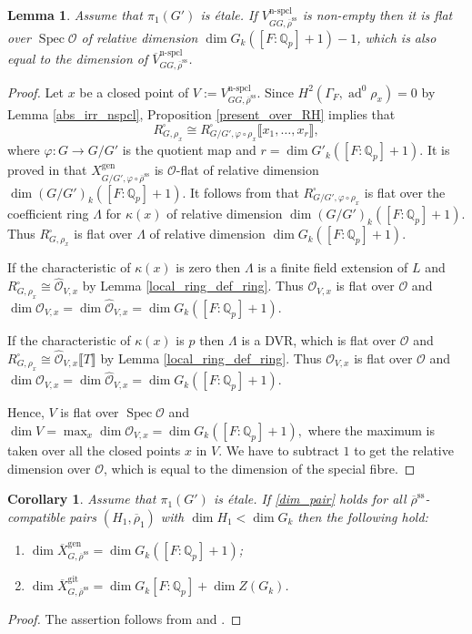 \documentclass{amsart}
\newtheorem{lem}[prop]{Lemma}
\newtheorem{cor}[prop]{Corollary}
\theoremstyle{definition}
\theoremstyle{remark}
\DeclareMathOperator{\Spec}{Spec}
\newcommand{\Qp}{\mathbb {Q}_p}
\newcommand{\Vbar}{\overline{{V}}}
\newcommand{\OO}{\mathcal O}
\DeclareMathOperator{\ad}{ad}
\newcommand{\br}[1]{\llbracket #1\rrbracket}
\newcommand{\rhobar}{\overline{\rho}}
\newcommand{\gen}{\mathrm{gen}}
\newcommand{\gps}{\mathrm{git}}
\newcommand{\Xbar}{\overline{X}}
\DeclareMathOperator{\nspcl}{n-spcl}
\newcommand{\rhobarss}{\rhobar^{\mathrm{ss}}}
\begin{document}
\begin{lem}\label{dim_Vnspcl} Assume that $\pi_1(G')$ is \'etale. If $V^{\nspcl}_{GG, \rhobarss}$ is non-empty then it is flat over $\Spec \OO$ of relative dimension $\dim G_k([F:\Qp]+1) -1$, which is also equal to the dimension of $\Vbar^{\nspcl}_{GG, \rhobarss}$.
\end{lem}
\begin{proof} Let $x$ be a closed point of $V:=V^{\nspcl}_{GG, \rhobarss}$. Since 
$H^2(\Gamma_F, \ad^0\rho_x)=0$ by Lemma \ref{abs_irr_nspcl}, Proposition \ref{present_over_RH} implies that 
\begin{equation}
R^{\square}_{G, \rho_x}\cong R^{\square}_{G/G', \varphi\circ \rho_x}\br{x_1,\ldots, x_r},
\end{equation}
where $\varphi: G \rightarrow G/G'$ is the quotient map and $r= \dim G'_k ([F:\Qp]+1)$. It is proved 
in \cite[Corollary 9.5]{defT}   that $X^{\gen}_{G/G', \varphi\circ \rhobarss}$ is 
$\OO$-flat of relative dimension $\dim (G/G')_k([F:\Qp] + 1)$. It follows from 
 that 
$R^{\square}_{G/G', \varphi\circ \rho_x}$ is flat over the coefficient ring $\Lambda$ for $\kappa(x)$ 
of relative dimension $\dim (G/G')_k([F:\Qp] + 1)$. Thus $R^{\square}_{G, \rho_x}$ is flat over $\Lambda$ of relative dimension $\dim G_k ([F:\Qp]+1)$. 

If the characteristic of $\kappa(x)$ is zero then $\Lambda$ is a finite field extension of $L$
and $R^{\square}_{G, \rho_x}\cong \hat{\OO}_{V,x}$ by Lemma \ref{local_ring_def_ring}. 
Thus $\OO_{V,x}$ is flat over $\OO$ and $\dim \OO_{V,x}= \dim \hat{\OO}_{V,x}= \dim G_k ([F:\Qp]+1)$. 

If the characteristic of $\kappa(x)$ is $p$ then $\Lambda$ is a DVR, which is flat over $\OO$ 
and $R^{\square}_{G, \rho_x}\cong \hat{\OO}_{V,x}\br{T}$ by Lemma \ref{local_ring_def_ring}.
Thus $\OO_{V,x}$ is flat over $\OO$ and $\dim \OO_{V,x}= \dim \hat{\OO}_{V,x}= \dim G_k ([F:\Qp]+1)$. 

Hence, $V$ is flat over $\Spec \OO$ and 
$\dim V= \max_{x} \dim \OO_{V,x}= \dim G_k ([F:\Qp]+1),$
where the maximum is taken over all the closed points $x$ in $V$. We have to subtract $1$ 
to get the relative dimension over $\OO$, which is equal to the dimension of the special fibre. 
\end{proof}

\begin{cor}\label{etale_bound_space} Assume that $\pi_1(G')$ is \'etale. If \eqref{dim_pair} holds for all $\rhobarss$-compatible pairs $(H_1, \rhobar_1)$ with $\dim H_1< \dim G_k$ then the following hold:
\begin{enumerate} 
\item $\dim \Xbar^{\gen}_{G, \rhobarss}= \dim G_k ([F:\Qp] +1)$;
\item $\dim \Xbar^{\gps}_{G, \rhobarss}= \dim G_k [F:\Qp] + \dim Z(G_k)$.
\end{enumerate} 
\end{cor} 
\begin{proof} The assertion follows from  and .
\end{proof} 
\end{document}
